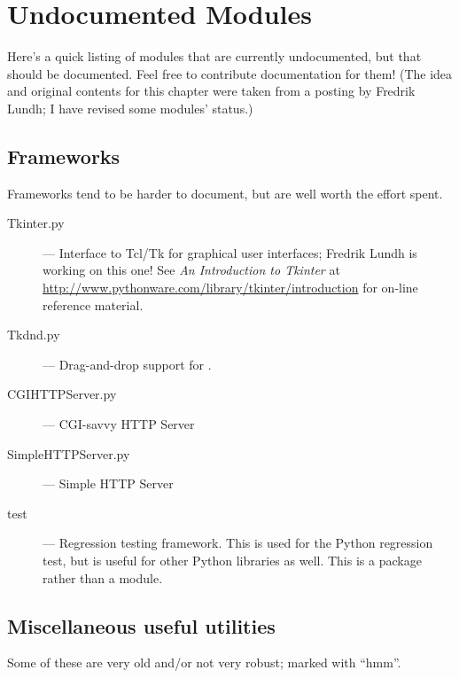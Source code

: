 \chapter{Undocumented Modules}
\label{undoc}

Here's a quick listing of modules that are currently undocumented, but
that should be documented.  Feel free to contribute documentation for
them!  (The idea and original contents for this chapter were taken
from a posting by Fredrik Lundh; I have revised some modules' status.)


\section{Frameworks}

Frameworks tend to be harder to document, but are well worth the
effort spent.

\begin{description}
\item[Tkinter.py]
--- Interface to Tcl/Tk for graphical user interfaces;
Fredrik Lundh is working on this one!  See \emph{An Introduction to
Tkinter} at
\url{http://www.pythonware.com/library/tkinter/introduction} for
on-line reference material.

\item[Tkdnd.py]
--- Drag-and-drop support for .

\item[CGIHTTPServer.py]
--- CGI-savvy HTTP Server

\item[SimpleHTTPServer.py]
--- Simple HTTP Server

\item[test]
--- Regression testing framework.  This is used for the Python
regression test, but is useful for other Python libraries as well.
This is a package rather than a module.
\end{description}


\section{Miscellaneous useful utilities}

Some of these are very old and/or not very robust; marked with ``hmm''.


